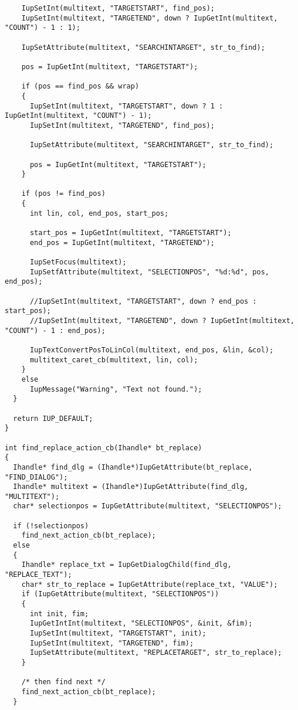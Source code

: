 \documentclass{ctexart}
\begin{document}
\begin{lstlisting}
    IupSetInt(multitext, "TARGETSTART", find_pos);
    IupSetInt(multitext, "TARGETEND", down ? IupGetInt(multitext, "COUNT") - 1 : 1);

    IupSetAttribute(multitext, "SEARCHINTARGET", str_to_find);

    pos = IupGetInt(multitext, "TARGETSTART");

    if (pos == find_pos && wrap)
    {
      IupSetInt(multitext, "TARGETSTART", down ? 1 : IupGetInt(multitext, "COUNT") - 1);
      IupSetInt(multitext, "TARGETEND", find_pos);

      IupSetAttribute(multitext, "SEARCHINTARGET", str_to_find);

      pos = IupGetInt(multitext, "TARGETSTART");
    }

    if (pos != find_pos)
    {
      int lin, col, end_pos, start_pos;

      start_pos = IupGetInt(multitext, "TARGETSTART");
      end_pos = IupGetInt(multitext, "TARGETEND");

      IupSetFocus(multitext);
      IupSetfAttribute(multitext, "SELECTIONPOS", "%d:%d", pos, end_pos);

      //IupSetInt(multitext, "TARGETSTART", down ? end_pos : start_pos);
      //IupSetInt(multitext, "TARGETEND", down ? IupGetInt(multitext, "COUNT") - 1 : end_pos);

      IupTextConvertPosToLinCol(multitext, end_pos, &lin, &col);
      multitext_caret_cb(multitext, lin, col);
    }
    else
      IupMessage("Warning", "Text not found.");
  }

  return IUP_DEFAULT;
}

int find_replace_action_cb(Ihandle* bt_replace)
{
  Ihandle* find_dlg = (Ihandle*)IupGetAttribute(bt_replace, "FIND_DIALOG");
  Ihandle* multitext = (Ihandle*)IupGetAttribute(find_dlg, "MULTITEXT");
  char* selectionpos = IupGetAttribute(multitext, "SELECTIONPOS");

  if (!selectionpos)
    find_next_action_cb(bt_replace);
  else
  {
    Ihandle* replace_txt = IupGetDialogChild(find_dlg, "REPLACE_TEXT");
    char* str_to_replace = IupGetAttribute(replace_txt, "VALUE");
    if (IupGetAttribute(multitext, "SELECTIONPOS"))
    {
      int init, fim;
      IupGetIntInt(multitext, "SELECTIONPOS", &init, &fim);
      IupSetInt(multitext, "TARGETSTART", init);
      IupSetInt(multitext, "TARGETEND", fim);
      IupSetAttribute(multitext, "REPLACETARGET", str_to_replace);
    }

    /* then find next */
    find_next_action_cb(bt_replace);
  }


\end{lstlisting}
\end{document}
